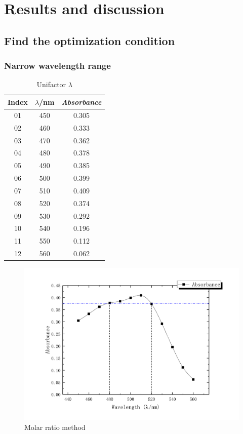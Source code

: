\ifx\SUM\undefined


\fi

\section{Results and discussion}

\subsection{Find the optimization condition}
\subsubsection{Narrow wavelength range}
\begin{table}[H]
	\caption{Unifactor $\lambda$}
	\label{Tab.Uni}
	\begin{tabular}{ccc}
	\toprule
	Index	& $\lambda$/nm 	& \emph{Absorbance}\\
	\midrule
	01		& 450			& 0.305\\
	02		& 460			& 0.333\\
	03		& 470			& 0.362\\
	04		& 480			& 0.378\\
	05		& 490			& 0.385\\
	06		& 500			& 0.399\\
	07		& 510			& 0.409\\
	08		& 520			& 0.374\\
	09		& 530			& 0.292\\
	10		& 540			& 0.196\\
	11		& 550			& 0.112\\
	12		& 560			& 0.062\\
	\bottomrule
	\end{tabular}
\end{table}

\begin{figure}[H]
	\includegraphics[width=\linewidth]{Fig0.pdf}
	\caption{Molar ratio method}
	\label{fig0}
\end{figure}

